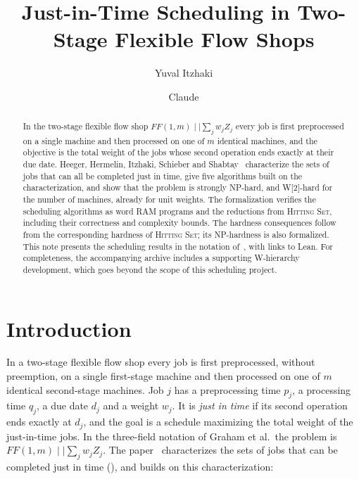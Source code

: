 \documentclass[11pt,a4paper]{article}
\title{Just-in-Time Scheduling in Two-Stage Flexible Flow Shops}
\author{Yuval Itzhaki \and Claude}
\date{}
\theoremstyle{definition}
\theoremstyle{plain}
\newcommand{\FF}{FF(1,m)\mid\mid\textstyle\sum_j w_jZ_j}
\newcommand{\HS}{\textsc{Hitting Set}}
\newcommand{\NP}{\textnormal{\textsf{NP}}}
\newcommand{\Wtwo}{\textnormal{\textsf{W[2]}}}
\begin{document}
\maketitle

\begin{abstract}
In the two-stage flexible flow shop $\FF$ every job is first preprocessed on a single machine
and then processed on one of $m$ identical machines, and the objective is the total weight of
the jobs whose second operation ends exactly at their due date. Heeger, Hermelin, Itzhaki,
Schieber and Shabtay~\cite{HHISS26} characterize the sets of jobs that can all be completed
just in time, give five algorithms built on the characterization, and show that the problem
is strongly \NP-hard, and \Wtwo-hard for the number of machines, already for unit weights.
The formalization verifies the scheduling algorithms as word RAM programs and the reductions
from \HS, including their correctness and complexity bounds. The hardness consequences
follow from the corresponding hardness of \HS; its \NP-hardness is also formalized.
This note presents the scheduling results in the notation of~\cite{HHISS26}, with links
to Lean. For completeness, the accompanying archive includes a supporting W-hierarchy
development, which goes beyond the scope of this scheduling project.
\end{abstract}

\section{Introduction}

In a two-stage flexible flow shop every job is first preprocessed, without preemption, on a
single first-stage machine and then processed on one of $m$ identical second-stage machines.
Job $j$ has a preprocessing time $p_j$, a processing time $q_j$, a due date $d_j$ and a weight
$w_j$. It is \emph{just in time} if its second operation ends exactly at $d_j$, and the goal is
a schedule maximizing the total weight of the just-in-time jobs. In the three-field notation of
Graham et al.\ the problem is $\FF$. The paper~\cite{HHISS26} characterizes the sets of jobs
that can be completed just in time (), and builds on this characterization:
\end{document}
